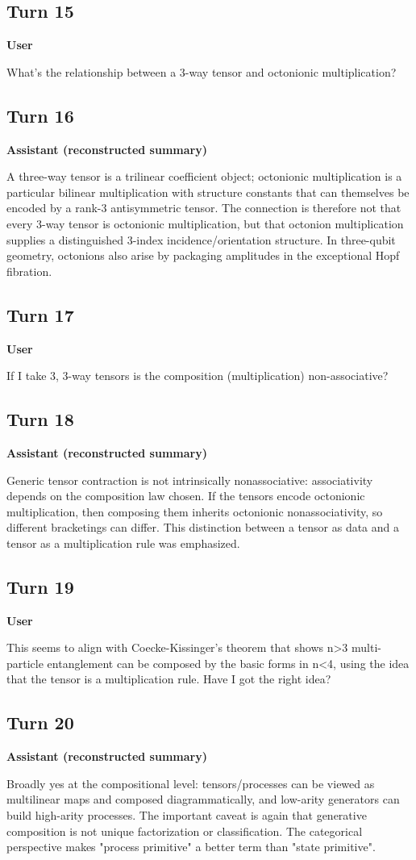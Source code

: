 \documentclass[11pt,a4paper]{article}
\newcommand{\speaker}[1]{\par\medskip\noindent\textbf{\large #1}\par\smallskip}
\begin{document}
\subsection*{Turn 15}
\speaker{User}
What's the relationship between a 3-way tensor and octonionic multiplication?
\subsection*{Turn 16}
\speaker{Assistant (reconstructed summary)}
A three-way tensor is a trilinear coefficient object; octonionic multiplication is a particular bilinear multiplication with structure constants that can themselves be encoded by a rank-3 antisymmetric tensor. The connection is therefore not that every 3-way tensor is octonionic multiplication, but that octonion multiplication supplies a distinguished 3-index incidence/orientation structure. In three-qubit geometry, octonions also arise by packaging amplitudes in the exceptional Hopf fibration.
\subsection*{Turn 17}
\speaker{User}
If I take 3, 3-way tensors is the composition (multiplication) non-associative?
\subsection*{Turn 18}
\speaker{Assistant (reconstructed summary)}
Generic tensor contraction is not intrinsically nonassociative: associativity depends on the composition law chosen. If the tensors encode octonionic multiplication, then composing them inherits octonionic nonassociativity, so different bracketings can differ. This distinction between a tensor as data and a tensor as a multiplication rule was emphasized.
\subsection*{Turn 19}
\speaker{User}
This seems to align with Coecke-Kissinger's theorem that shows n>3 multi-particle entanglement can be composed by the basic forms in n<4, using the idea that the tensor is a multiplication rule. Have I got the right idea?
\subsection*{Turn 20}
\speaker{Assistant (reconstructed summary)}
Broadly yes at the compositional level: tensors/processes can be viewed as multilinear maps and composed diagrammatically, and low-arity generators can build high-arity processes. The important caveat is again that generative composition is not unique factorization or classification. The categorical perspective makes "process primitive" a better term than "state primitive".
\end{document}
